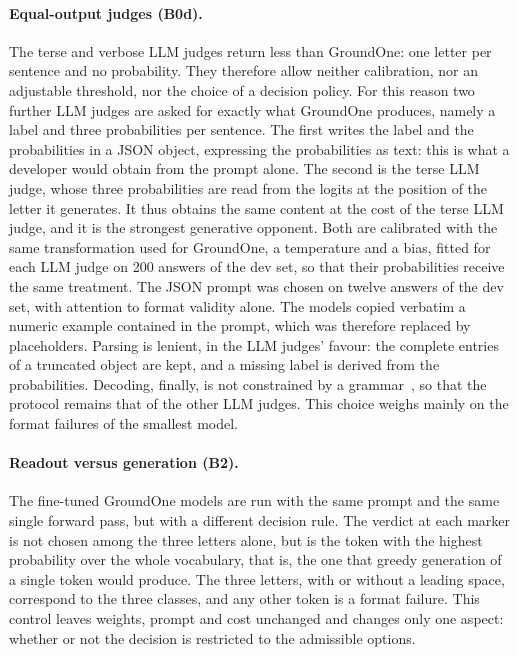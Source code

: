 \paragraph{Equal-output judges (B0d).} The terse and verbose LLM judges return less than GroundOne: one letter per sentence
and no probability. They therefore allow neither calibration, nor an adjustable threshold, nor the choice of a decision
policy. For this reason two further LLM judges are asked for exactly what GroundOne produces, namely a label and three
probabilities per sentence. The first writes the label and the probabilities in a JSON object, expressing the
probabilities as text: this is what a developer would obtain from the prompt alone. The second is the terse LLM judge, whose
three probabilities are read from the logits at the position of the letter it generates. It thus obtains the same
content at the cost of the terse LLM judge, and it is the strongest generative opponent. Both are calibrated with the same
transformation used for GroundOne, a temperature and a bias, fitted for each LLM judge on 200 answers of the dev set, so
that their probabilities receive the same treatment. The JSON prompt was chosen on twelve answers of the dev set, with
attention to format validity alone. The models copied verbatim a numeric example contained in the prompt, which was
therefore replaced by placeholders. Parsing is lenient, in the LLM judges' favour: the complete entries of a truncated
object are kept, and a missing label is derived from the probabilities. Decoding, finally, is not constrained by a
grammar~\cite{willard2023outlines}, so that the protocol remains that of the other LLM judges. This choice weighs mainly on
the format failures of the smallest model.

\paragraph{Readout versus generation (B2).} The fine-tuned GroundOne models are run with the same prompt and the same
single forward pass, but with a different decision rule. The verdict at each marker is not chosen among the three
letters alone, but is the token with the highest probability over the whole vocabulary, that is, the one that greedy
generation of a single token would produce. The three letters, with or without a leading space, correspond to the three
classes, and any other token is a format failure. This control leaves weights, prompt and cost unchanged and changes
only one aspect: whether or not the decision is restricted to the admissible options.

